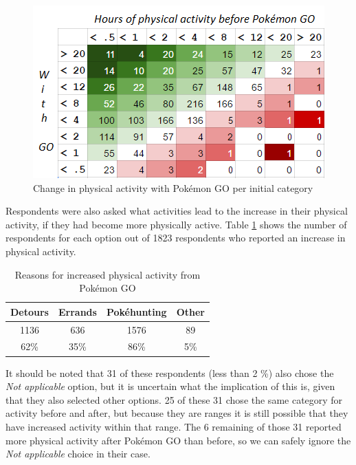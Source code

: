 \begin{figure}[h]
	\centering
	\includegraphics{Figures/change-in-physical-activity-table-colors}
	\caption{Change in physical activity with Pokémon GO per initial category}
	\label{fig:change-in-physical-activity}
\end{figure}

Respondents were also asked what activities lead to the increase in their physical activity, if they had become more physically active. Table \ref{tbl:physical-activity-sources} shows the number of respondents for each option out of 1823 respondents who reported an increase in physical activity.

\begin{table}[h]
	\centering
	\caption{Reasons for increased physical activity from Pokémon GO}
	\label{tbl:physical-activity-sources}
	\begin{tabular}{|c|c|c|c|}
		\hline
		\textbf{Detours} & \textbf{Errands} & \textbf{Pokéhunting} & \textbf{Other}\\\hline\hline
		1136 & 636 & 1576 & 89\\
		62\% & 35\% & 86\% & 5\%\\\hline
	\end{tabular}
\end{table}

It should be noted that 31 of these respondents (less than 2 \%) also chose the \emph{Not applicable} option, but it is uncertain what the implication of this is, given that they also selected other options. 25 of these 31 chose the same category for activity before and after, but because they are ranges it is still possible that they have increased activity within that range. The 6 remaining of those 31 reported more physical activity after Pokémon GO than before, so we can safely ignore the \emph{Not applicable} choice in their case. 

